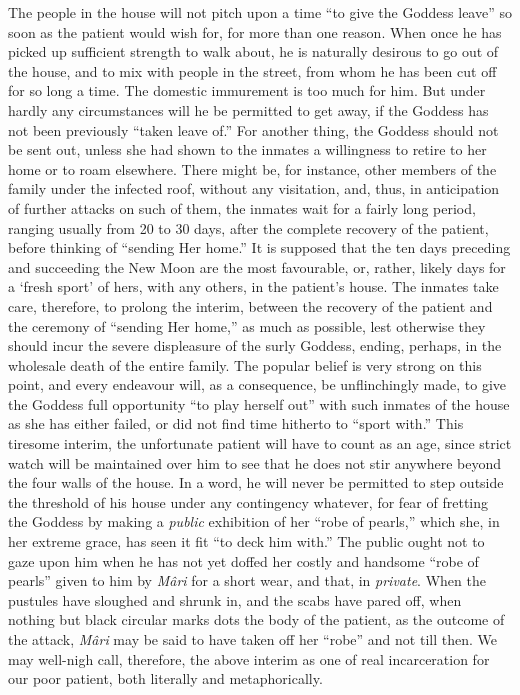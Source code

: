 \documentclass[a4paper, 12pt, oneside, english, twocolumn]{article}
\begin{document}
The people in the house will not pitch upon a time ``to give the Goddess leave'' so soon as the patient would wish for, for more than one reason. When once he has picked up sufficient strength to walk about, he is naturally desirous to go out of the house, and to mix with people in the street, from whom he has been cut off for so long a time. The domestic immurement is too much for him. But under hardly any circumstances will he be permitted to get away, if the Goddess has not been previously ``taken leave of.'' For another thing, the Goddess should not be sent out, unless she had shown to the inmates a willingness to retire to her home or to roam elsewhere. There might be, for instance, other members of the family under the infected roof, without any visitation, and, thus, in anticipation of further attacks on such of them, the inmates wait for a fairly long period, ranging usually from 20 to 30 days, after the complete recovery of the patient, before thinking of ``sending Her home.'' It is supposed that the ten days preceding and succeeding the New Moon are the most favourable, or, rather, likely days for a `fresh sport' of hers, with any others, in the patient's house. The inmates take care, therefore, to prolong the interim, between the recovery of the patient and the ceremony of ``sending Her home,'' as much as possible, lest otherwise they should incur the severe displeasure of the surly Goddess, ending, perhaps, in the wholesale death of the entire family. The popular belief is very strong on this point, and every endeavour will, as a consequence, be unflinchingly made, to give the Goddess full opportunity ``to play herself out'' with such inmates of the house as she has either failed, or did not find time hitherto to ``sport with.'' This tiresome interim, the unfortunate patient will have to count as an age, since strict watch will be maintained over him to see that he does not stir anywhere beyond the four walls of the house. In a word, he will never be permitted to step outside the threshold of his house under any contingency whatever, for fear of fretting the Goddess by making a \emph{public} exhibition of her ``robe of pearls,'' which she, in her extreme grace, has seen it fit ``to deck him with.'' The public ought not to gaze upon him when he has not yet doffed her costly and handsome ``robe of pearls'' given to him by \emph{Mâri} for a short wear, and that, in \emph{private}. When the pustules have sloughed and shrunk in, and the scabs have pared off, when nothing but black circular marks dots the body of the patient, as the outcome of the attack, \emph{Mâri} may be said to have taken off her ``robe'' and not till then. We may well-nigh call, therefore, the above interim as one of real incarceration for our poor patient, both literally and metaphorically.
\end{document}

